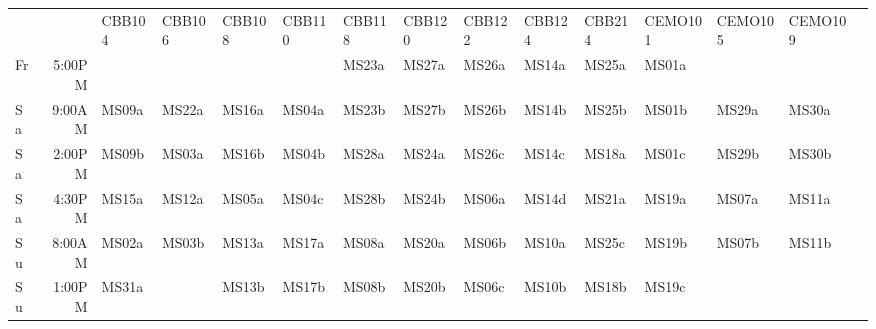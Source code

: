 \begin{sidewaystable}
\begin{tabular}{lrlllllllllllll}
   &         & CBB104 & CBB106 & CBB108 & CBB110 & CBB118 & CBB120 & CBB122 & CBB124 & CBB214 & CEMO101 & CEMO105 & CEMO109 \\
\rowcolor{p1color!20}
Fr &  5:00PM &        &        &        &        & MS23a  & MS27a  & MS26a  & MS14a  & MS25a  & MS01a   &         &         \\
\rowcolor{p2color!30}
Sa &  9:00AM & MS09a  & MS22a  & MS16a  & MS04a  & MS23b  & MS27b  & MS26b  & MS14b  & MS25b  & MS01b   & MS29a   & MS30a   \\
\rowcolor{p2color!20}
Sa &  2:00PM & MS09b  & MS03a  & MS16b  & MS04b  & MS28a  & MS24a  & MS26c  & MS14c  & MS18a  & MS01c   & MS29b   & MS30b   \\
\rowcolor{p2color!10}
Sa &  4:30PM & MS15a  & MS12a  & MS05a  & MS04c  & MS28b  & MS24b  & MS06a  & MS14d  & MS21a  & MS19a   & MS07a   & MS11a   \\
\rowcolor{p3color!30}
Su &  8:00AM & MS02a  & MS03b  & MS13a  & MS17a  & MS08a  & MS20a  & MS06b  & MS10a  & MS25c  & MS19b   & MS07b   & MS11b   \\
\rowcolor{p3color!20}
Su & 1:00PM & MS31a  &        & MS13b  & MS17b  & MS08b  & MS20b  & MS06c  & MS10b  & MS18b  & MS19c   &         &         \\
\end{tabular}
\end{sidewaystable}
